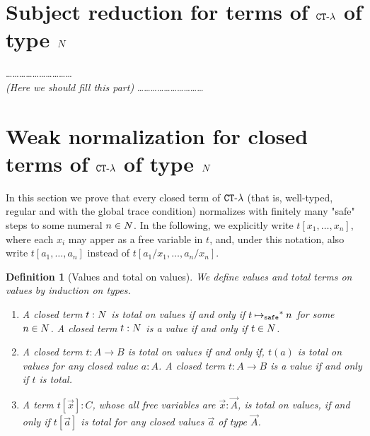 \documentclass{article}
\newtheorem{definition}[theorem]{Definition}
\begin{document}
\section{Subject reduction for terms of ${ {\tt CT} \mbox{-} \lambda}$ of type ${N}$}
\ldots\ldots\ldots\ldots\ldots\ldots\ldots\ldots\ldots\ldots
\\
\emph{(Here we should fill this part)}
\ldots\ldots\ldots\ldots\ldots\ldots\ldots\ldots\ldots\ldots
{}


\section{Weak normalization for closed terms of ${ {\tt CT} \mbox{-} \lambda}$ of type ${N}$}
\label{section-weak-normalization}
In this section we prove that every closed term of ${ {\tt CT} \mbox{-} \lambda}$
 (that is, well-typed, regular and with the global trace condition) normalizes with finitely many "safe" steps
to some numeral $n \in {N}$.
In the following, we explicitly write $t[x_1,\ldots,x_n]$,
where each $x_i$ may apper as a free variable in $t$, 
and, under this notation, also write $t[a_1,\ldots,a_n]$ instead of $t[a_1/x_1,\ldots,a_n/x_n]$. 


\begin{definition}[Values and total on values]
  We define values and total terms on values by induction on types. 
  \begin{enumerate}
  \item
    A closed term $t:{N}$ is total on values
    if and only if $t \mathbin{{\mapsto}_{\tiny \tt safe}}^* n$ for some $n\in {N}$.
    A closed term $t:{N}$ is a value if and only if $t \in {N}$.
  \item
    A closed term $t:A\rightarrow B$ is total on values
    if and only if, $t(a)$ is total on values for any closed value $a:A$.
    A closed term $t:A\rightarrow B$ is a value if and only if $t$ is total.
  \item
    A term $t[\vec{x}]:C$, whose all free variables are $\vec{x}:\vec{A}$, is
    total on values, if and only if
    $t[\vec{a}]$ is total for any closed values $\vec{a}$ of type $\vec{A}$.
  \end{enumerate}
\end{definition}
\end{document}
